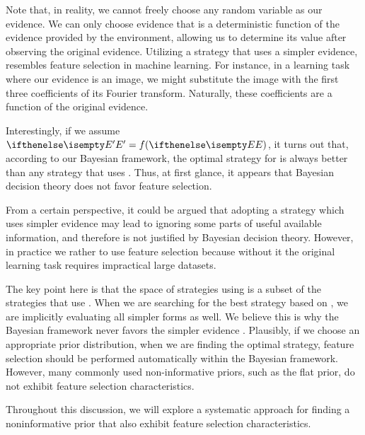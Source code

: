 Note that, in reality, we cannot freely choose any random variable as our evidence.
We can only choose evidence that is a deterministic function of the evidence provided by the environment,
allowing us to determine its value after observing the original evidence.
Utilizing a strategy that uses a simpler evidence, resembles feature selection in machine learning.
For instance, in a learning task where our evidence is an image, we might substitute the image with the first
three coefficients of its Fourier transform.
Naturally, these coefficients are a function of the original evidence.

Interestingly, if we assume $\rv{E'} = f(\rv{E})$, it turns out
that, according to our Bayesian framework, the optimal strategy for  is always
better than any strategy that uses .
Thus, at first glance, it appears that Bayesian decision theory does not favor feature selection.

From a certain perspective, it could be argued that adopting a strategy which uses simpler evidence may lead to
ignoring some parts of useful available information, and therefore is not justified by Bayesian
decision theory.
However, in practice we rather to use feature selection because without it the original learning task requires
impractical large datasets.

The key point here is that the space of strategies using  is a subset of the strategies that use .
When we are searching for the best strategy based on , we are implicitly evaluating all simpler forms as well.
We believe this is why the Bayesian framework never favors the simpler evidence .
Plausibly, if we choose an appropriate prior distribution, when we are finding the optimal
strategy, feature selection should be performed automatically within the Bayesian framework.
However, many commonly used non-informative priors, such as the flat prior, do not exhibit feature
selection characteristics.

Throughout this discussion, we will explore a systematic approach for finding a noninformative prior that also
exhibit feature selection characteristics.

